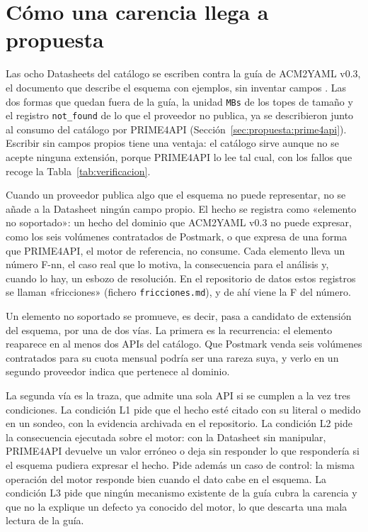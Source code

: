 \section{Cómo una carencia llega a propuesta}
\label{sec:esquema:metodo}\label{sec:propuesta:conformidad}\label{sec:evolucion:metodo}\label{sec:evolucion:clases}

Las ocho Datasheets del catálogo se escriben contra la guía de ACM2YAML v0.3, el documento que describe el esquema con ejemplos, sin inventar campos \citep{apisconsumptionmodel}.
Las dos formas que quedan fuera de la guía, la unidad \texttt{MBs} de los topes de tamaño y el registro \texttt{not\_found} de lo que el proveedor no publica, ya se describieron junto al consumo del catálogo por PRIME4API (Sección~\ref{sec:propuesta:prime4api}).
Escribir sin campos propios tiene una ventaja: el catálogo sirve aunque no se acepte ninguna extensión, porque PRIME4API lo lee tal cual, con los fallos que recoge la Tabla~\ref{tab:verificacion}.

Cuando un proveedor publica algo que el esquema no puede representar, no se añade a la Datasheet ningún campo propio.
El hecho se registra como «elemento no soportado»: un hecho del dominio que ACM2YAML v0.3 no puede expresar, como los seis volúmenes contratados de Postmark, o que expresa de una forma que PRIME4API, el motor de referencia, no consume.
Cada elemento lleva un número F-nn, el caso real que lo motiva, la consecuencia para el análisis y, cuando lo hay, un esbozo de resolución.
En el repositorio de datos estos registros se llaman «fricciones» (fichero \texttt{fricciones.md}), y de ahí viene la F del número.

Un elemento no soportado se promueve, es decir, pasa a candidato de extensión del esquema, por una de dos vías.
La primera es la recurrencia: el elemento reaparece en al menos dos APIs del catálogo.
Que Postmark venda seis volúmenes contratados para su cuota mensual podría ser una rareza suya, y verlo en un segundo proveedor indica que pertenece al dominio.

La segunda vía es la traza, que admite una sola API si se cumplen a la vez tres condiciones.
La condición L1 pide que el hecho esté citado con su literal o medido en un sondeo, con la evidencia archivada en el repositorio.
La condición L2 pide la consecuencia ejecutada sobre el motor: con la Datasheet sin manipular, PRIME4API devuelve un valor erróneo o deja sin responder lo que respondería si el esquema pudiera expresar el hecho.
Pide además un caso de control: la misma operación del motor responde bien cuando el dato cabe en el esquema.
La condición L3 pide que ningún mecanismo existente de la guía cubra la carencia y que no la explique un defecto ya conocido del motor, lo que descarta una mala lectura de la guía.

